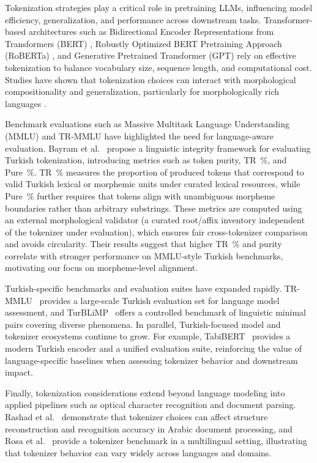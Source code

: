 Tokenization strategies play a critical role in pretraining LLMs, influencing model efficiency, generalization, and performance across downstream tasks. Transformer-based architectures such as Bidirectional Encoder Representations from Transformers (BERT) \cite{devlin_bert_2019}, Robustly Optimized BERT Pretraining Approach (RoBERTa) \cite{liu_roberta_2019}, and Generative Pretrained Transformer (GPT) \cite{radford_language_2019} rely on effective tokenization to balance vocabulary size, sequence length, and computational cost. Studies have shown that tokenization choices can interact with morphological compositionality and generalization, particularly for morphologically rich languages \cite{ismayilzada_evaluating_2025}.

Benchmark evaluations such as Massive Multitask Language Understanding (MMLU) \cite{hendrycks_measuring_2021} and TR-MMLU \cite{bayram_setting_2025} have highlighted the need for language-aware evaluation. Bayram et al.~\cite{bayram_tokenization_2025} propose a linguistic integrity framework for evaluating Turkish tokenization, introducing metrics such as token purity, TR~\%, and Pure~\%. TR~\% measures the proportion of produced tokens that correspond to valid Turkish lexical or morphemic units under curated lexical resources, while Pure~\% further requires that tokens align with unambiguous morpheme boundaries rather than arbitrary substrings. These metrics are computed using an external morphological validator (a curated root/affix inventory independent of the tokenizer under evaluation), which ensures fair cross-tokenizer comparison and avoids circularity. Their results suggest that higher TR~\% and purity correlate with stronger performance on MMLU-style Turkish benchmarks, motivating our focus on morpheme-level alignment.

Turkish-specific benchmarks and evaluation suites have expanded rapidly. TR-MMLU~\cite{bayram_setting_2025} provides a large-scale Turkish evaluation set for language model assessment, and TurBLiMP~\cite{basar_turblimp_2025} offers a controlled benchmark of linguistic minimal pairs covering diverse phenomena. In parallel, Turkish-focused model and tokenizer ecosystems continue to grow. For example, TabiBERT~\cite{turker_tabibert_2026} provides a modern Turkish encoder and a unified evaluation suite, reinforcing the value of language-specific baselines when assessing tokenizer behavior and downstream impact.

Finally, tokenization considerations extend beyond language modeling into applied pipelines such as optical character recognition and document parsing. Rashad et al.~\cite{rashad_arabic_nougat_2024} demonstrate that tokenizer choices can affect structure reconstruction and recognition accuracy in Arabic document processing, and Rosa et al.~\cite{rosa_tokenizer_benchmark_2024} provide a tokenizer benchmark in a multilingual setting, illustrating that tokenizer behavior can vary widely across languages and domains.
